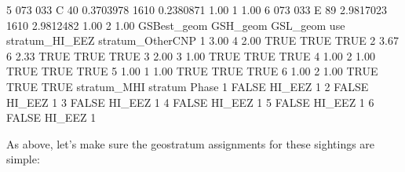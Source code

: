\documentclass[
]{book}
\newenvironment{Shaded}{\begin{snugshade}}{\end{snugshade}}
\newcommand{\ConstantTok}[1]{\textcolor[rgb]{0.56,0.35,0.01}{#1}}
\newcommand{\DecValTok}[1]{\textcolor[rgb]{0.00,0.00,0.81}{#1}}
\newcommand{\FloatTok}[1]{\textcolor[rgb]{0.00,0.00,0.81}{#1}}
\newcommand{\NormalTok}[1]{#1}
\newcommand{\OtherTok}[1]{\textcolor[rgb]{0.56,0.35,0.01}{#1}}
\newcommand{\SpecialCharTok}[1]{\textcolor[rgb]{0.81,0.36,0.00}{\textbf{#1}}}
\newcommand{\StringTok}[1]{\textcolor[rgb]{0.31,0.60,0.02}{#1}}
\begin{document}
\begin{Shaded}
\begin{Highlighting}[]
\DecValTok{5}     \DecValTok{073}     \DecValTok{033}\NormalTok{      C    }\DecValTok{40} \FloatTok{0.3703978}   \DecValTok{1610} \FloatTok{0.2380871}   \FloatTok{1.00}   \DecValTok{1} \FloatTok{1.00}
\DecValTok{6}     \DecValTok{073}     \DecValTok{033}\NormalTok{      E    }\DecValTok{89} \FloatTok{2.9817023}   \DecValTok{1610} \FloatTok{2.9812482}   \FloatTok{1.00}   \DecValTok{2} \FloatTok{1.00}
\NormalTok{  GSBest\_geom GSH\_geom GSL\_geom  use stratum\_HI\_EEZ stratum\_OtherCNP}
\DecValTok{1}        \FloatTok{3.00}        \DecValTok{4}     \FloatTok{2.00} \ConstantTok{TRUE}           \ConstantTok{TRUE}             \ConstantTok{TRUE}
\DecValTok{2}        \FloatTok{3.67}        \DecValTok{6}     \FloatTok{2.33} \ConstantTok{TRUE}           \ConstantTok{TRUE}             \ConstantTok{TRUE}
\DecValTok{3}        \FloatTok{2.00}        \DecValTok{3}     \FloatTok{1.00} \ConstantTok{TRUE}           \ConstantTok{TRUE}             \ConstantTok{TRUE}
\DecValTok{4}        \FloatTok{1.00}        \DecValTok{2}     \FloatTok{1.00} \ConstantTok{TRUE}           \ConstantTok{TRUE}             \ConstantTok{TRUE}
\DecValTok{5}        \FloatTok{1.00}        \DecValTok{1}     \FloatTok{1.00} \ConstantTok{TRUE}           \ConstantTok{TRUE}             \ConstantTok{TRUE}
\DecValTok{6}        \FloatTok{1.00}        \DecValTok{2}     \FloatTok{1.00} \ConstantTok{TRUE}           \ConstantTok{TRUE}             \ConstantTok{TRUE}
\NormalTok{  stratum\_MHI stratum Phase}
\DecValTok{1}       \ConstantTok{FALSE}\NormalTok{  HI\_EEZ     }\DecValTok{1}
\DecValTok{2}       \ConstantTok{FALSE}\NormalTok{  HI\_EEZ     }\DecValTok{1}
\DecValTok{3}       \ConstantTok{FALSE}\NormalTok{  HI\_EEZ     }\DecValTok{1}
\DecValTok{4}       \ConstantTok{FALSE}\NormalTok{  HI\_EEZ     }\DecValTok{1}
\DecValTok{5}       \ConstantTok{FALSE}\NormalTok{  HI\_EEZ     }\DecValTok{1}
\DecValTok{6}       \ConstantTok{FALSE}\NormalTok{  HI\_EEZ     }\DecValTok{1}
\end{Highlighting}
\end{Shaded}

As above, let's make sure the geostratum assignments for these sightings are simple:

\begin{Shaded}
\end{Shaded}
\end{document}
